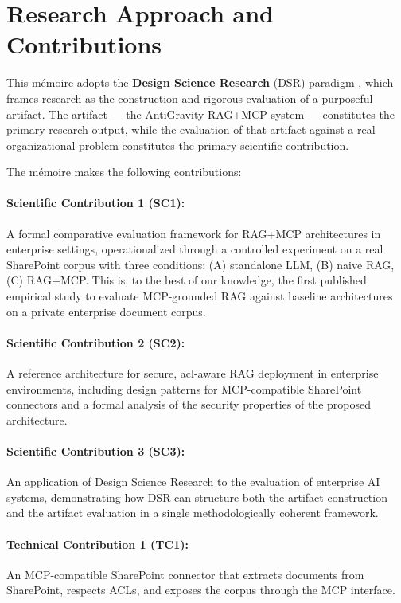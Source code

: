 \section{Research Approach and Contributions}
\label{sec:intro-contributions}

This mémoire adopts the \textbf{Design Science Research} (DSR) paradigm \citep{Hevner2004}, which frames research as the construction and rigorous evaluation of a purposeful artifact. The artifact — the AntiGravity RAG+MCP system — constitutes the primary research output, while the evaluation of that artifact against a real organizational problem constitutes the primary scientific contribution.

The mémoire makes the following contributions:

\paragraph{Scientific Contribution 1 (SC1):} A formal comparative evaluation framework for RAG+MCP architectures in enterprise settings, operationalized through a controlled experiment on a real SharePoint corpus with three conditions: (A) standalone LLM, (B) naive RAG, (C) RAG+MCP. This is, to the best of our knowledge, the first published empirical study to evaluate MCP-grounded RAG against baseline architectures on a private enterprise document corpus.

\paragraph{Scientific Contribution 2 (SC2):} A reference architecture for secure, \gls{acl}-aware RAG deployment in enterprise environments, including design patterns for MCP-compatible SharePoint connectors and a formal analysis of the security properties of the proposed architecture.

\paragraph{Scientific Contribution 3 (SC3):} An application of Design Science Research to the evaluation of enterprise AI systems, demonstrating how DSR can structure both the artifact construction and the artifact evaluation in a single methodologically coherent framework.

\paragraph{Technical Contribution 1 (TC1):} An MCP-compatible SharePoint connector that extracts documents from SharePoint, respects ACLs, and exposes the corpus through the MCP interface.

